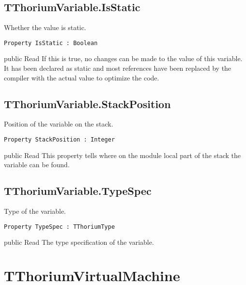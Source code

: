 \subsection{TThoriumVariable.IsStatic}
\label{thoriumcorepkg:thorium:tthoriumvariable:isstatic}
\begin{FPCList}
\Synopsis
Whether the value is static.\Declaration 

\begin{verbatim}
Property IsStatic : Boolean
\end{verbatim}
\Visibility
public
\Access
Read
\Description
If this is true, no changes can be made to the value of this variable. It has been declared as static and most references have been replaced by the compiler with the actual value to optimize the code.\end{FPCList}
\subsection{TThoriumVariable.StackPosition}
\label{thoriumcorepkg:thorium:tthoriumvariable:stackposition}
\begin{FPCList}
\Synopsis
Position of the variable on the stack.\Declaration 

\begin{verbatim}
Property StackPosition : Integer
\end{verbatim}
\Visibility
public
\Access
Read
\Description
This property tells where on the module local part of the stack the variable can be found.\end{FPCList}
\subsection{TThoriumVariable.TypeSpec}
\label{thoriumcorepkg:thorium:tthoriumvariable:typespec}
\begin{FPCList}
\Synopsis
Type of the variable.\Declaration 

\begin{verbatim}
Property TypeSpec : TThoriumType
\end{verbatim}
\Visibility
public
\Access
Read
\Description
The type specification of the variable. \end{FPCList}
\section{TThoriumVirtualMachine}
\label{thoriumcorepkg:thorium:tthoriumvirtualmachine}
